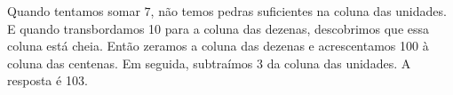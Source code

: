 \documentclass[12pt]{book}
\begin{document}
\vspace{0.2cm}
\begin{minipage}{0.4\textwidth}
\end{minipage}%
%
\begin{minipage}{0.5\textwidth}
\end{minipage}

\vspace{0.2cm}
Quando tentamos somar $7$, não temos
pedras suficientes na coluna das unidades.
E quando transbordamos 10 para a coluna
das dezenas, descobrimos que essa coluna
está cheia. Então zeramos a coluna das
dezenas e acrescentamos 100 à coluna
das centenas. Em seguida, subtraímos 3
da coluna das unidades. A resposta é 103.

\vspace{0.2cm}
\begin{minipage}{0.4\textwidth}
\end{minipage}%
%
\begin{minipage}{0.5\textwidth}
\end{minipage}
\end{document}
